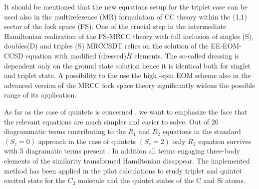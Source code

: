 It should be mentioned that the new equations setup for the triplet case can be used also in the multireference (MR) formulation of CC theory within the (1,1) sector of the fock space (FS).  One of the crucial step in the intermediate Hamiltonian realization of the FS-MRCC theory  with full inclusion of singles (S), doubles(D) and triples (S) MRCCSDT relies on the solution of the EE-EOM-CCSD equation with modified (dressed)\(\bar{H}\) elements. The so-called dressing is dependent only on the ground state solution hence it is identical both for singlet and triplet state. A possibility to the use the high -spin EOM scheme also in the advanced version of the MRCC fock space theory significantly widens the possible range of its application. 

As far as the case of quintets is concerned , we want to emphasize the face that the relevant equations are much simpler and easier to solve. Out of 26 diagrammatic terms contributing  to the \(R_{1}\) and \(R_{2}\) equations in the standard \((S_{z} = 0)\)  approach in the case of quintets \((S_{z} = 2)\) only \(R_{2}\) equation survives with 5 diagramatic terms present . In addition all terms  engaging three-body elements of the similarity transformed Hamiltonian disappear. The implemented method has been applied in the pilot calculations to study triplet and quintet excited state for the \(C_{2}\) molecule and the quintet states of the C and Si atoms.
